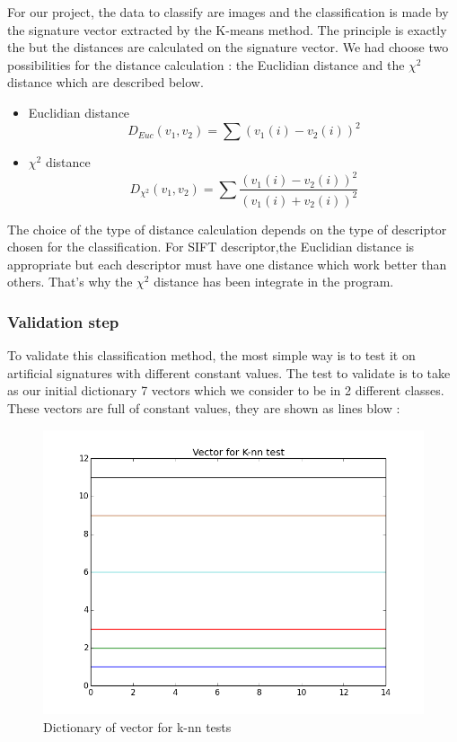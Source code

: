 \documentclass[12pt]{article}
\begin{document}
For our project, the data to classify are images and the classification is made by the signature vector extracted by the K-means method. The principle is exactly the but the distances are calculated on the signature vector.
We had choose two possibilities for the distance calculation : the Euclidian distance and the $\chi^2$ distance which are described below.
\begin{itemize}
\item Euclidian distance
\vspace{0.5cm}
\begin{equation}
D_{Euc}(v_1,v_2) = \sum{(v_1(i)-v_2(i))^2}
\end{equation}

\item $\chi^2$ distance
\vspace{0.5cm}
\begin{equation}
D_{\chi^2}(v_1,v_2) =  \sum{\frac{(v_1(i)-v_2(i))^2}{(v_1(i)+v_2(i))^2}}
\end{equation}

\end{itemize}

The choice of the type of distance calculation depends on the type of descriptor chosen for the classification. For SIFT descriptor,the Euclidian distance is appropriate but each descriptor must have one distance which work better than others.
That's why the $\chi^2$ distance has been integrate in the program.

\subsubsection{Validation step}

To validate this classification method, the most simple way is to test it on artificial signatures with different constant values.
The test to validate is to take as our initial dictionary 7 vectors which we consider to be in 2 different classes. These vectors are full of constant values, they are shown as lines blow : 

\begin{figure}[h]
    \center
    \includegraphics[scale=0.65]{knnTestVec.png}
    \caption{Dictionary of vector for k-nn tests}\label{fig:Color Difference by image shifting illustration}
\end{figure} 
\end{document}
